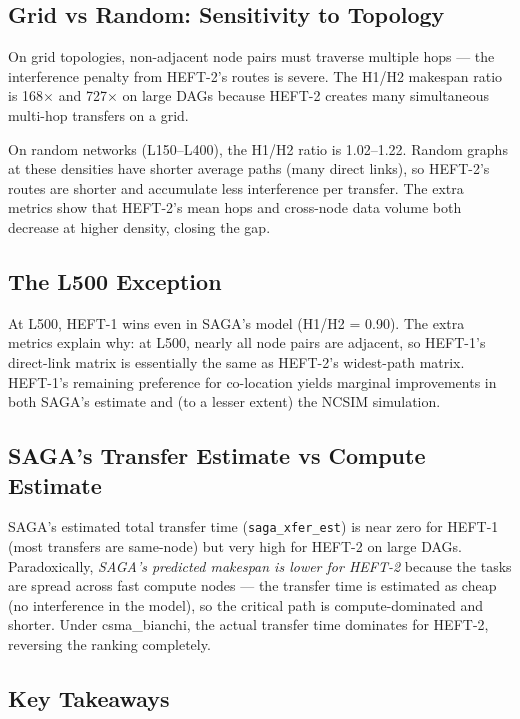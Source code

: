 \documentclass[11pt]{article}
\begin{document}
\subsection{Grid vs Random: Sensitivity to Topology}

On grid topologies, non-adjacent node pairs must traverse multiple hops — the
interference penalty from HEFT-2's routes is severe.  The H1/H2 makespan ratio
is 168$\times$ and 727$\times$ on large DAGs because HEFT-2 creates many
simultaneous multi-hop transfers on a grid.

On random networks (L150--L400), the H1/H2 ratio is 1.02--1.22.  Random graphs
at these densities have shorter average paths (many direct links), so HEFT-2's
routes are shorter and accumulate less interference per transfer.  The extra metrics
show that HEFT-2's mean hops and cross-node data volume both decrease at higher
density, closing the gap.

\subsection{The L500 Exception}

At L500, HEFT-1 wins even in SAGA's model (H1/H2 = 0.90).  The extra metrics
explain why: at L500, nearly all node pairs are adjacent, so HEFT-1's direct-link
matrix is essentially the same as HEFT-2's widest-path matrix.  HEFT-1's remaining
preference for co-location yields marginal improvements in both SAGA's estimate
and (to a lesser extent) the NCSIM simulation.

\subsection{SAGA's Transfer Estimate vs Compute Estimate}

SAGA's estimated total transfer time (\texttt{saga\_xfer\_est}) is near zero for
HEFT-1 (most transfers are same-node) but very high for HEFT-2 on large DAGs.
Paradoxically, \emph{SAGA's predicted makespan is lower for HEFT-2} because the
tasks are spread across fast compute nodes — the transfer time is estimated as
cheap (no interference in the model), so the critical path is compute-dominated
and shorter.  Under csma\_bianchi, the actual transfer time dominates for HEFT-2,
reversing the ranking completely.

\subsection{Key Takeaways}
\end{document}
